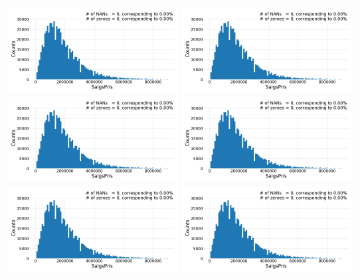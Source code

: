 \begin{figure}
  \centering
  \subfloat{\qquad}
  \includegraphics[draft=false, width=0.4\textwidth, page=1, trim=15 0 15 0, clip]{figures/housing/overview_fig.pdf}\hfil
  \subfloat{\qquad}
  \includegraphics[draft=false, width=0.4\textwidth, page=2, trim=15 0 15 0, clip]{figures/housing/overview_fig.pdf}
  \subfloat{\qquad}
  \includegraphics[draft=false, width=0.4\textwidth, page=3, trim=15 0 15 0, clip]{figures/housing/overview_fig.pdf}\hfil
  \subfloat{\qquad}
  \includegraphics[draft=false, width=0.4\textwidth, page=4, trim=15 0 15 0, clip]{figures/housing/overview_fig.pdf}
  \subfloat{\qquad}
  \includegraphics[draft=false, width=0.4\textwidth, page=5, trim=15 0 15 0, clip]{figures/housing/overview_fig.pdf}\hfil
  \subfloat{\qquad}
  \includegraphics[draft=false, width=0.4\textwidth, page=6, trim=15 0 15 0, clip]{figures/housing/overview_fig.pdf}

\end{figure}
